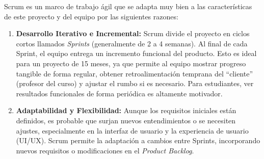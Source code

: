 Scrum es un marco de trabajo ágil que se adapta muy bien a las características de este proyecto y del equipo por las siguientes razones:

\begin{enumerate}
    \item \textbf{Desarrollo Iterativo e Incremental:}
    Scrum divide el proyecto en ciclos cortos llamados \textit{Sprints} (generalmente de 2 a 4 semanas). Al final de cada Sprint, el equipo entrega un incremento funcional del producto. Esto es ideal para un proyecto de 15 meses, ya que permite al equipo mostrar progreso tangible de forma regular, obtener retroalimentación temprana del ``cliente'' (profesor del curso) y ajustar el rumbo si es necesario. Para estudiantes, ver resultados funcionales de forma periódica es altamente motivador.

    \item \textbf{Adaptabilidad y Flexibilidad:}
    Aunque los requisitos iniciales están definidos, es probable que surjan nuevos entendimientos o se necesiten ajustes, especialmente en la interfaz de usuario y la experiencia de usuario (UI/UX). Scrum permite la adaptación a cambios entre Sprints, incorporando nuevos requisitos o modificaciones en el \textit{Product Backlog}.


\end{enumerate}
